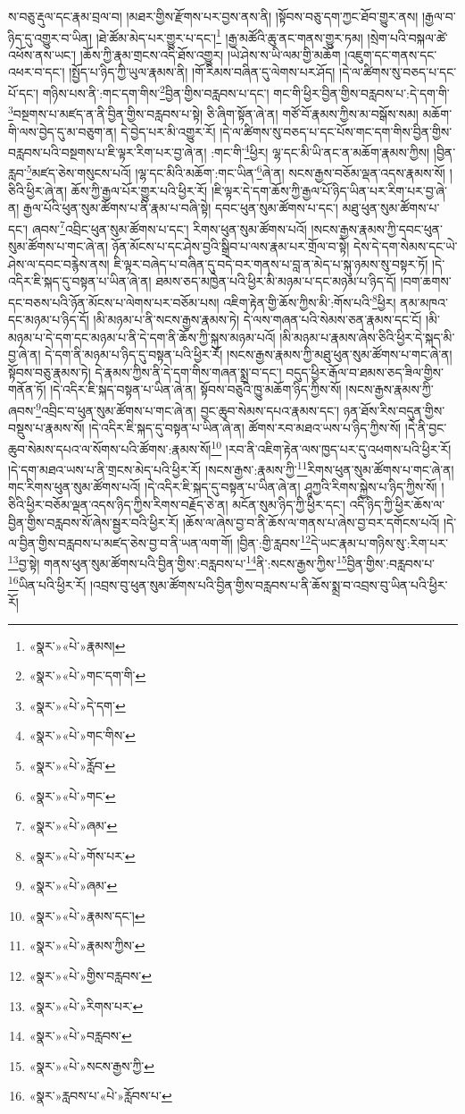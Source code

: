 ས་བཅུ་རྡུལ་དང་རྣམ་བྲལ་བ། །མཐར་གྱིས་རྫོགས་པར་བྱས་ནས་ནི། །སྟོབས་བཅུ་དག་ཀྱང་ཐོབ་གྱུར་ནས། །རྒྱལ་བ་ཉིད་དུ་འགྱུར་བ་ཡིན། །ཐེ་ཚོམ་མེད་པར་གྱུར་པ་དང་།\footnote{«སྣར་»«པེ་»རྣམས།} །རྒྱ་མཚོའི་ཆུ་ནང་གནས་གྱུར་ཏམ། །སྲེག་པའི་བསྐལ་ཚེ་འཕོས་ནས་ཡང་། །ཆོས་ཀྱི་རྣམ་གྲངས་འདི་ཐོས་འགྱུར། །ཡེ་ཤེས་ས་ཡི་ལམ་གྱི་མཆོག །འཇུག་དང་གནས་དང་འཕར་བ་དང་། །སྤྱོད་པ་ཉིད་ཀྱི་ཡུལ་རྣམས་ནི། །གོ་རིམས་བཞིན་དུ་ལེགས་པར་ཤོད། །དེ་ལ་ཚིགས་སུ་བཅད་པ་དང་པོ་དང་། གཉིས་པས་ནི་:གང་དག་གིས་\footnote{«སྣར་»«པེ་»གང་དག་གི་}བྱིན་གྱིས་བརླབས་པ་དང་། གང་གི་ཕྱིར་བྱིན་གྱིས་བརླབས་པ་:དེ་དག་གི་\footnote{«སྣར་»«པེ་»དེ་དག་}བསྔགས་པ་མཛད་ན་ནི་བྱིན་གྱིས་བརླབས་པ་སྟེ། ཅི་ཞིག་སྟོན་ཞེ་ན། གཙོ་བོ་རྣམས་ཀྱིས་མ་བསྒོས་སམ། མཆོག་གི་ལས་བྱེད་དུ་མ་བཅུག་ན། དེ་བྱེད་པར་མི་འགྱུར་རོ། །དེ་ལ་ཚིགས་སུ་བཅད་པ་དང་པོས་གང་དག་གིས་བྱིན་གྱིས་བརླབས་པའི་བསྔགས་པ་ཇི་ལྟར་རིག་པར་བྱ་ཞེ་ན། :གང་གི་\footnote{«སྣར་»«པེ་»གང་གིས་}ཕྱིར། ལྷ་དང་མི་ཡི་ནང་ན་མཆོག་རྣམས་ཀྱིས། །བྱིན་རླབ་\footnote{«སྣར་»«པེ་»རློབ་}མཛད་ཅེས་གསུངས་པའོ། །ལྷ་དང་མིའི་མཆོག་:གང་ཡིན་\footnote{«སྣར་»«པེ་»གང་}ཞེ་ན། སངས་རྒྱས་བཅོམ་ལྡན་འདས་རྣམས་སོ། །ཅིའི་ཕྱིར་ཞེ་ན། ཆོས་ཀྱི་རྒྱལ་པོར་གྱུར་པའི་ཕྱིར་རོ། །ཇི་ལྟར་དེ་དག་ཆོས་ཀྱི་རྒྱལ་པོ་ཉིད་ཡིན་པར་རིག་པར་བྱ་ཞེ་ན། རྒྱལ་པོའི་ཕུན་སུམ་ཚོགས་པ་ནི་རྣམ་པ་བཞི་སྟེ། དབང་ཕུན་སུམ་ཚོགས་པ་དང་། མཐུ་ཕུན་སུམ་ཚོགས་པ་དང་། ཞབས་\footnote{«སྣར་»«པེ་»ཞམ་}འབྲིང་ཕུན་སུམ་ཚོགས་པ་དང་། རིགས་ཕུན་སུམ་ཚོགས་པའོ། །སངས་རྒྱས་རྣམས་ཀྱི་དབང་ཕུན་སུམ་ཚོགས་པ་གང་ཞེ་ན། ཉོན་མོངས་པ་དང་ཤེས་བྱའི་སྒྲིབ་པ་ལས་རྣམ་པར་གྲོལ་བ་སྟེ། དེས་དེ་དག་སེམས་དང་ཡེ་ཤེས་ལ་དབང་བརྙེས་ནས། ཇི་ལྟར་བཞེད་པ་བཞིན་དུ་བདེ་བར་གནས་པ་བླ་ན་མེད་པ་སྐུ་ཉམས་སུ་བསྟར་ཏོ། །དེ་འདིར་ཇི་སྐད་དུ་བསྟན་པ་ཡིན་ཞེ་ན། ཐམས་ཅད་མཁྱེན་པའི་ཕྱིར་མི་མཉམ་པ་དང་མཉམ་པ་ཉིད་དོ། །བག་ཆགས་དང་བཅས་པའི་ཉོན་མོངས་པ་ལེགས་པར་བཅོམ་པས། འཇིག་རྟེན་གྱི་ཆོས་ཀྱིས་མི་:གོས་པའི་\footnote{«སྣར་»«པེ་»གོས་པར་}ཕྱིར། ནམ་མཁའ་དང་མཉམ་པ་ཉིད་དོ། །མི་མཉམ་པ་ནི་སངས་རྒྱས་རྣམས་ཏེ། དེ་ལས་གཞན་པའི་སེམས་ཅན་རྣམས་དང་ངོ། །མི་མཉམ་པ་དེ་དག་དང་མཉམ་པ་ནི་དེ་དག་ནི་ཆོས་ཀྱི་སྐུས་མཉམ་པའོ། །མི་མཉམ་པ་རྣམས་ཞེས་ཅིའི་ཕྱིར་དེ་སྐད་མི་བྱ་ཞེ་ན། དེ་དག་ནི་མཉམ་པ་ཉིད་དུ་བསྟན་པའི་ཕྱིར་རོ། །སངས་རྒྱས་རྣམས་ཀྱི་མཐུ་ཕུན་སུམ་ཚོགས་པ་གང་ཞེ་ན། སྟོབས་བཅུ་རྣམས་ཏེ། དེ་རྣམས་ཀྱིས་ནི་དེ་དག་གིས་གཞན་སྨྲ་བ་དང་། བདུད་ཕྱིར་རྒོལ་བ་ཐམས་ཅད་ཟིལ་གྱིས་གནོན་ཏོ། །དེ་འདིར་ཇི་སྐད་བསྟན་པ་ཡིན་ཞེ་ན། སྟོབས་བཅུའི་ཁྱུ་མཆོག་ཉིད་ཀྱིས་སོ། །སངས་རྒྱས་རྣམས་ཀྱི་ཞབས་\footnote{«སྣར་»«པེ་»ཞམ་}འབྲིང་བ་ཕུན་སུམ་ཚོགས་པ་གང་ཞེ་ན། བྱང་ཆུབ་སེམས་དཔའ་རྣམས་དང་། ཉན་ཐོས་རིས་བདུན་གྱིས་བསྡུས་པ་རྣམས་སོ། །དེ་འདིར་ཇི་སྐད་དུ་བསྟན་པ་ཡིན་ཞེ་ན། ཚོགས་རབ་མཐའ་ཡས་པ་ཉིད་ཀྱིས་སོ། །དེ་ནི་བྱང་ཆུབ་སེམས་དཔའ་ལ་སོགས་པའི་ཚོགས་:རྣམས་སོ།\footnote{«སྣར་»«པེ་»རྣམས་དང་།} །རབ་ནི་འཇིག་རྟེན་ལས་ཁྱད་པར་དུ་འཕགས་པའི་ཕྱིར་རོ། །དེ་དག་མཐའ་ཡས་པ་ནི་གྲངས་མེད་པའི་ཕྱིར་རོ། །སངས་རྒྱས་:རྣམས་ཀྱི་\footnote{«སྣར་»«པེ་»རྣམས་ཀྱིས་}རིགས་ཕུན་སུམ་ཚོགས་པ་གང་ཞེ་ན། གང་རིགས་ཕུན་སུམ་ཚོགས་པའོ། །དེ་འདིར་ཇི་སྐད་དུ་བསྟན་པ་ཡིན་ཞེ་ན། ཤཱཀྱའི་རིགས་སྐྱེས་པ་ཉིད་ཀྱིས་སོ། །ཅིའི་ཕྱིར་བཅོམ་ལྡན་འདས་ཉིད་ཀྱིས་རིགས་བརྗོད་ཅེ་ན། མངོན་སུམ་ཉིད་ཀྱི་ཕྱིར་དང་། འདི་ཉིད་ཀྱི་ཕྱིར་ཆོས་ལ་བྱིན་གྱིས་བརླབས་སོ་ཞེས་སྦྱར་བའི་ཕྱིར་རོ། །ཆོས་ལ་ཞེས་བྱ་བ་ནི་ཆོས་ལ་གནས་པ་ཞེས་བྱ་བར་དགོངས་པའོ། །དེ་ལ་བྱིན་གྱིས་བརླབས་པ་མཛད་ཅེས་བྱ་བ་ནི་ཡན་ལག་གོ། །བྱིན་:གྱི་རླབས་\footnote{«སྣར་»«པེ་»གྱིས་བརླབས་}དེ་ཡང་རྣམ་པ་གཉིས་སུ་:རིག་པར་\footnote{«སྣར་»«པེ་»རིགས་པར་}བྱ་སྟེ། གནས་ཕུན་སུམ་ཚོགས་པའི་བྱིན་གྱིས་:བརླབས་པ་\footnote{«སྣར་»«པེ་»བརླབས་}ནི་:སངས་རྒྱས་ཀྱིས་\footnote{«སྣར་»«པེ་»སངས་རྒྱས་ཀྱི་}བྱིན་གྱིས་:བརླབས་པ་\footnote{«སྣར་»རླབས་པ་«པེ་»རློབས་པ་}ཡིན་པའི་ཕྱིར་རོ། །འབྲས་བུ་ཕུན་སུམ་ཚོགས་པའི་བྱིན་གྱིས་བརླབས་པ་ནི་ཆོས་སྨྲ་བ་འབྲས་བུ་ཡིན་པའི་ཕྱིར་རོ། 
